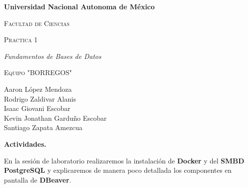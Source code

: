 \documentclass[12pt]{report}
\begin{document}
\begin{titlepage}
\centering
{\bfseries\LARGE Universidad Nacional Autonoma de M\'exico \par}
\vspace{1cm}
{\scshape\Large Facultad de Ciencias \par}
\vspace{3cm}
{\scshape\Huge Practica 1  \par}
\vspace{3cm}
{\itshape\Large Fundamentos de Bases de Datos \par}
\vfill
{\scshape\Huge Equipo "BORREGOS"  \par}
\vspace{3cm}
{\Large Aaron López Mendoza \\ Rodrigo Zaldivar Alanis \\ Isaac Giovani Escobar \\ Kevin Jonathan Garduño Escobar \\ Santiago Zapata Amezcua \par}
\vfill
\end{titlepage}
\clearpage

\setcounter{page}{1}

{\LARGE\bfseries\textcolor{azul}{Actividades.}}\par\vspace{0.5em}

En la sesión de laboratorio realizaremos la instalación de \textbf{Docker} y del \textbf{SMBD PostgreSQL} y explicaremos de manera poco detallada los componentes en pantalla de \textbf{DBeaver}.

\bigskip
\end{document}
